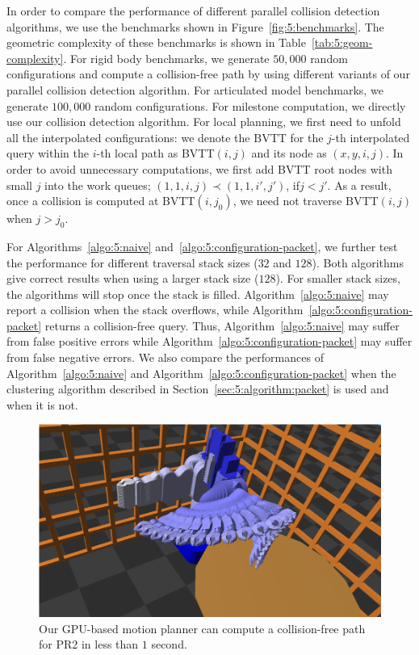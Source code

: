 In order to compare the performance of different parallel collision detection algorithms, we use the benchmarks shown
in Figure~\ref{fig:5:benchmarks}. The geometric complexity of these benchmarks is shown in  Table~\ref{tab:5:geom-complexity}.
For rigid body benchmarks, we generate $50,000$ random configurations and compute a collision-free path by using different
variants of our parallel collision detection algorithm. For articulated model benchmarks, we generate $100,000$
random configurations. For milestone computation, we directly use our collision
detection algorithm. For local planning, we first need to unfold all the interpolated configurations: we denote the
BVTT for the $j$-th interpolated query within the $i$-th local path as BVTT$(i,j)$ and its node as $(x,y,i,j)$.
In order to avoid unnecessary computations, we first add BVTT root nodes with small $j$ into the work queues; $(1,1,i,j) \prec (1,1,i',j')$, if$j < j'$. As a result, once a collision is computed at BVTT$(i, j_0)$,
we need not traverse BVTT$(i, j)$ when $j > j_0$.

For Algorithms~\ref{algo:5:naive} and~\ref{algo:5:configuration-packet}, we further test the performance for
different traversal stack sizes ($32$ and $128$). Both algorithms give correct results when using a larger stack size ($128$). For smaller stack sizes, the algorithms will stop once the stack is filled.
Algorithm~\ref{algo:5:naive} may report a collision when the stack overflows, while Algorithm~\ref{algo:5:configuration-packet}
returns a collision-free query. Thus, Algorithm~\ref{algo:5:naive} may suffer from false positive errors while Algorithm~\ref{algo:5:configuration-packet}
may suffer from false negative errors. We also
compare the performances of Algorithm~\ref{algo:5:naive} and Algorithm~\ref{algo:5:configuration-packet} when the clustering algorithm described in Section~\ref{sec:5:algorithm:packet} is used and when it is not.

\begin{figure}[!htb]
  \centering
  \includegraphics[width=\linewidth]{figs/5/pr2_result.png}
  \caption[The GPU-based motion planner can compute a collision-free path for PR2 in less than $1$ second]{Our GPU-based motion planner can compute a collision-free path for PR2 in less than $1$ second. }
  \label{fig:5:PR2result}
\end{figure}


